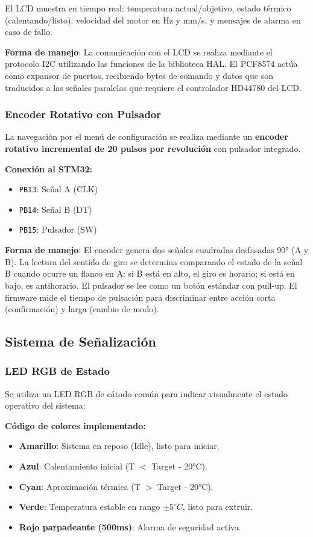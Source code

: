 \documentclass[12pt]{article}
\begin{document}
El LCD muestra en tiempo real: temperatura actual/objetivo, estado térmico (calentando/listo), velocidad del motor en Hz y mm/s, y mensajes de alarma en caso de fallo.

\textbf{Forma de manejo}: La comunicación con el LCD se realiza mediante el protocolo I2C utilizando las funciones de la biblioteca HAL. El PCF8574 actúa como expansor de puertos, recibiendo bytes de comando y datos que son traducidos a las señales paralelas que requiere el controlador HD44780 del LCD. 

\subsubsection{Encoder Rotativo con Pulsador}
La navegación por el menú de configuración se realiza mediante un \textbf{encoder rotativo incremental de 20 pulsos por revolución} con pulsador integrado.

\textbf{Conexión al STM32:}
\begin{itemize}
    \item \texttt{PB13}: Señal A (CLK)
    \item \texttt{PB14}: Señal B (DT)
    \item \texttt{PB15}: Pulsador (SW)
\end{itemize}

\textbf{Forma de manejo}: El encoder genera dos señales cuadradas desfasadas 90° (A y B). La lectura del sentido de giro se determina comparando el estado de la señal B cuando ocurre un flanco en A: si B está en alto, el giro es horario; si está en bajo, es antihorario. El pulsador se lee como un botón estándar con pull-up. El firmware mide el tiempo de pulsación para discriminar entre acción corta (confirmación) y larga (cambio de modo).

\subsection{Sistema de Señalización}

\subsubsection{LED RGB de Estado}
Se utiliza un LED RGB de cátodo común para indicar visualmente el estado operativo del sistema:

\textbf{Código de colores implementado:}
\begin{itemize}
    \item \textbf{Amarillo}: Sistema en reposo (Idle), listo para iniciar.
    \item \textbf{Azul}: Calentamiento inicial (T $<$ Target - 20°C).
    \item \textbf{Cyan}: Aproximación térmica (T $>$ Target - 20°C).
    \item \textbf{Verde}: Temperatura estable en rango $\pm5^\circ C$, listo para extruir.
    \item \textbf{Rojo parpadeante (500ms)}: Alarma de seguridad activa.
\end{itemize}
\end{document}
